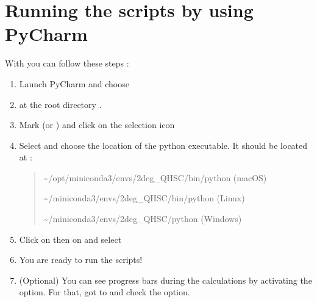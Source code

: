 \documentclass[letterpaper,10pt,english]{sphinxmanual}
\begin{document}
\section{Running the scripts by using PyCharm}
\label{\detokenize{usage:running-the-scripts-by-using-pycharm}}
\sphinxAtStartPar
With  you can follow these steps :
\begin{enumerate}
%
\item {} 
\sphinxAtStartPar
Launch PyCharm and choose 

\item {} 
\sphinxAtStartPar
{} at the root directory .

\item {} 
\sphinxAtStartPar
Mark  (or )
and click on the selection icon 

\item {} 
\sphinxAtStartPar
Select  and choose the location of the python executable.
It should be located at :
\begin{quote}

\sphinxAtStartPar
\textasciitilde{}/opt/miniconda3/envs/2deg\_QH\sphinxhyphen{}SC/bin/python (macOS)

\sphinxAtStartPar
\textasciitilde{}/miniconda3/envs/2deg\_QH\sphinxhyphen{}SC/bin/python (Linux)

\sphinxAtStartPar
\textasciitilde{}/miniconda3/envs/2deg\_QH\sphinxhyphen{}SC/python (Windows)
\end{quote}

\item {} 
\sphinxAtStartPar
Click on  then on  and select 

\item {} 
\sphinxAtStartPar
You are ready to run the scripts!

\item {} 
\sphinxAtStartPar
(Optional) You can see progress bars during the calculations by activating the
 option. For that, got to 
and check the option.

\end{enumerate}
\end{document}
